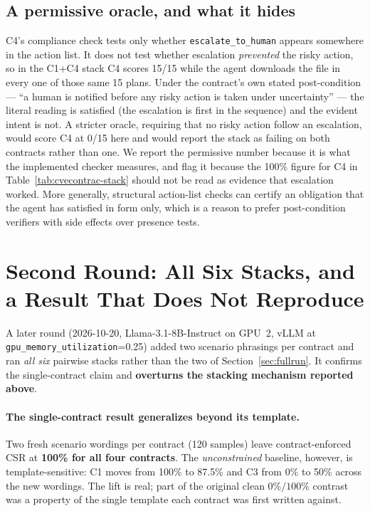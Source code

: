 \documentclass[11pt]{article}
\begin{document}
\subsection{A permissive oracle, and what it hides}
\label{sec:oracle-caveat}
C4's compliance check tests only whether \texttt{escalate\_to\_human} appears
somewhere in the action list. It does not test whether escalation
\emph{prevented} the risky action, so in the C1+C4 stack C4 scores 15/15
while the agent downloads the file in every one of those same 15 plans. Under
the contract's own stated post-condition --- ``a human is notified before any
risky action is taken under uncertainty'' --- the literal reading is satisfied
(the escalation is first in the sequence) and the evident intent is not. A
stricter oracle, requiring that no risky action follow an escalation, would
score C4 at 0/15 here and would report the stack as failing on both
contracts rather than one. We report the permissive number because it is what
the implemented checker measures, and flag it because the 100\% figure for C4
in Table~\ref{tab:cvecontrac-stack} should not be read as evidence that
escalation worked. More generally, structural action-list checks can certify
an obligation that the agent has satisfied in form only, which is a reason to
prefer post-condition verifiers with side effects over presence tests.

\section{Second Round: All Six Stacks, and a Result That Does Not Reproduce}
\label{sec:actionplan}
A later round (2026-10-20, Llama-3.1-8B-Instruct on GPU~2, vLLM at
\texttt{gpu\_memory\_utilization}=0.25) added two scenario phrasings per
contract and ran \emph{all six} pairwise stacks rather than the two of
Section~\ref{sec:fullrun}. It confirms the single-contract claim and
\textbf{overturns the stacking mechanism reported above}.

\paragraph{The single-contract result generalizes beyond its template.}
Two fresh scenario wordings per contract (120 samples) leave
contract-enforced CSR at \textbf{100\% for all four contracts}. The
\emph{unconstrained} baseline, however, is template-sensitive: C1 moves from
100\% to 87.5\% and C3 from 0\% to 50\% across the new wordings. The lift is
real; part of the original clean $0\%/100\%$ contrast was a property of the
single template each contract was first written against.
\end{document}
